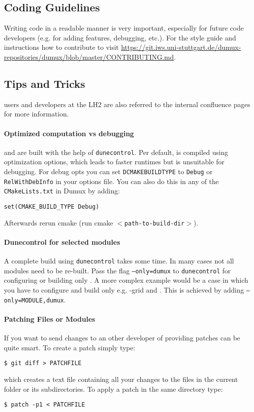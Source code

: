 \subsection{Coding Guidelines}
Writing code in a readable manner is very important, especially
for future code developers (e.g. for adding features, debugging, etc.).
For the style guide and instructions how to contribute to \Dumux visit
\url{https://git.iws.uni-stuttgart.de/dumux-repositories/dumux/blob/master/CONTRIBUTING.md}.


\subsection{Tips and Tricks}
\Dumux users and developers at the LH2 are also referred to the internal confluence pages for
more information.

\paragraph{Optimized computation vs debugging}
\Dune and \Dumux are built with the help of \texttt{dunecontrol}.
Per default, \Dumux is compiled using optimization options, which leads to faster runtimes but is unsuitable
for debugging. For debug opts you can set \texttt{DCMAKE\textunderscore BUILD\textunderscore TYPE} to \texttt{Debug} or \texttt{RelWithDebInfo}
in your options file. You can also do this in any of the \texttt{CMakeLists.txt} in Dumux by adding:

\begin{lstlisting}[style=Shell]
set(CMAKE_BUILD_TYPE Debug)
\end{lstlisting}

Afterwards rerun cmake (run cmake \texttt{$<$path-to-build-dir$>$}).

\paragraph{Dunecontrol for selected modules}
A complete build using \texttt{dunecontrol} takes some time. In many cases not all modules need to be re-built.
Pass the flag \texttt{--only=dumux} to \texttt{dunecontrol} for configuring or building only \Dumux. A more
complex example would be a case in which you have to configure and build only e.g. \Dune{}-grid
and \Dumux. This is achieved by adding \texttt{--only=MODULE,dumux}.

\paragraph{Patching Files or Modules}
If you want to send changes to an other developer of \Dumux providing patches
can be quite smart. To create a patch simply type:
\begin{lstlisting}[style=Bash]
$ git diff > PATCHFILE
\end{lstlisting}
\noindent which creates a text file containing all your changes to the files
in the current folder or its subdirectories.
To apply a patch in the same directory type:
\begin{lstlisting}[style=Bash]
$ patch -p1 < PATCHFILE
\end{lstlisting}

